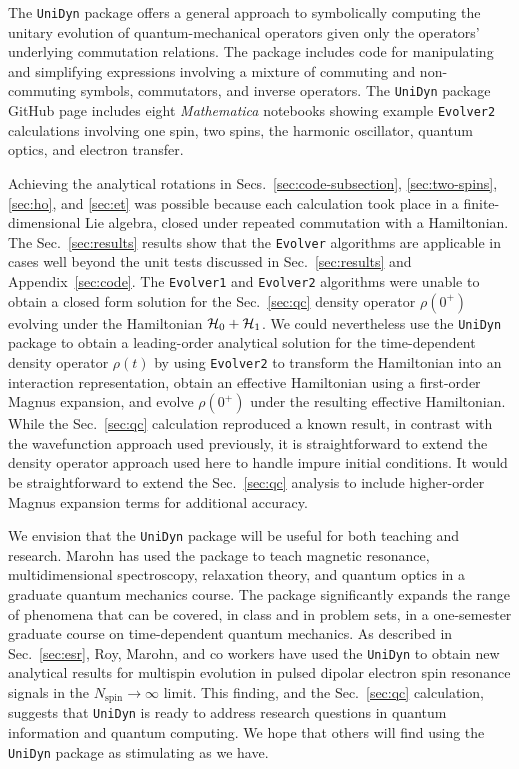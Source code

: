 
The \verb+UniDyn+ package offers a general approach to symbolically computing the unitary evolution of quantum-mechanical operators given only the operators’ underlying commutation relations.
The package includes code for manipulating and simplifying expressions involving a mixture of commuting and non-commuting symbols, commutators, and inverse operators.
The \verb+UniDyn+ package GitHub page includes eight \emph{Mathematica} notebooks showing example \verb+Evolver2+ calculations involving one spin, two spins, the harmonic oscillator, quantum optics, and electron transfer.

Achieving the analytical rotations in Secs.~\ref{sec:code-subsection}, \ref{sec:two-spins}, \ref{sec:ho}, and \ref{sec:et} was possible because each calculation took place in a finite-dimensional Lie algebra, closed under repeated commutation with a Hamiltonian.
The Sec.~\ref{sec:results} results show that the \verb+Evolver+ algorithms are applicable in cases well beyond the unit tests discussed in Sec.~\ref{sec:results} and Appendix~\ref{sec:code}.
The \verb+Evolver1+ and \verb+Evolver2+ algorithms were unable to obtain a closed form solution for the Sec.~\ref{sec:qc} density operator $\rho(0^{+})$ evolving under the Hamiltonian ${\cal H}_0 + {\cal H}_1$.
We could nevertheless use the \verb+UniDyn+ package to obtain a leading-order analytical solution for the time-dependent density operator $\rho(t)$ by using \verb+Evolver2+ to transform the Hamiltonian into an interaction representation, obtain an effective Hamiltonian using a first-order Magnus expansion, and evolve $\rho(0^{+})$ under the resulting effective Hamiltonian.
While the Sec.~\ref{sec:qc} calculation reproduced a known result, in contrast with the wavefunction approach used previously, it is straightforward to extend the density operator approach used here to handle impure initial conditions.
It would be straightforward to extend the Sec.~\ref{sec:qc} analysis to include higher-order Magnus expansion terms for additional accuracy.

We envision that the \verb+UniDyn+ package will be useful for both teaching and research.
Marohn has used the package to teach magnetic resonance, multidimensional spectroscopy, relaxation theory, and quantum optics in a graduate quantum mechanics course.
The package significantly expands the range of phenomena that can be covered, in class and in problem sets, in a one-semester graduate course on time-dependent quantum mechanics.
As described in Sec.~\ref{sec:esr}, Roy, Marohn, and co workers have used the \verb+UniDyn+ to obtain new analytical results for multispin evolution in pulsed dipolar electron spin resonance signals in the $N_{\mathrm{spin}} \rightarrow \infty$ limit. 
This finding, and the Sec.~\ref{sec:qc} calculation, suggests that  \verb+UniDyn+ is ready to address research questions in quantum information and quantum computing.
We hope that others will find using the \verb+UniDyn+ package as stimulating as we have.


